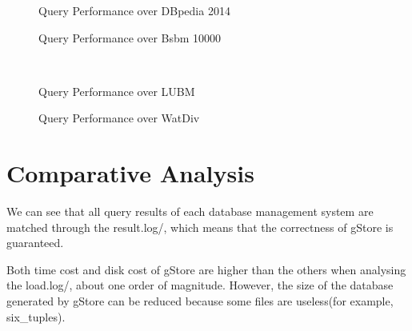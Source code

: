 \documentclass[titlepage, a4paper, 12pt] {article}
\begin{document}
\begin{figure}[b]%
	\resizebox{0.48\columnwidth}{!}{
		
	}
	\caption{Query Performance over DBpedia 2014}%
	\label{fig:dbpedia2014Performance}
\end{figure}

\begin{figure}%
	\resizebox{0.8\columnwidth}{!}{
		
	}
	\caption{Query Performance over Bsbm 10000}%
	\label{fig:BsbmPerformance}
\end{figure}


\begin{figure}[t]%
	\subfigure[LUBM 500]{%
		\resizebox{0.98\columnwidth}{!}{
			
		}
		\label{fig:LUBM500Performance}%
	}
	\\
	\subfigure[LUBM 5000]{%
		\resizebox{0.98\columnwidth}{!}{
			
		}
		\label{fig:LUBM5000Performance}%
	}%
	\caption{Query Performance over LUBM}%
	\label{fig:LUBMPerformance}
\end{figure}

\begin{figure}[t]%
	\subfigure[WatDiv 10M]{%
		\resizebox{0.8\columnwidth}{!}{
			
		}
		\label{fig:WatDiv10MPerformance}%
	}
	\subfigure[WatDiv 100M]{%
		\resizebox{0.8\columnwidth}{!}{
			
		}
		\label{fig:WatDiv100MPerformance}%
	}
	\subfigure[WatDiv 300M]{%
		\resizebox{0.8\columnwidth}{!}{
			
		}
		\label{fig:WatDiv300MPerformance}%
	}%
	\caption{Query Performance over WatDiv}%
	\label{fig:WatDivPerformance}
\end{figure}

\clearpage

\section{Comparative Analysis}

We can see that all query results of each database management system are matched through the result.log/, 
which means that the correctness of gStore is guaranteed. 

Both time cost and disk cost of gStore are higher than the others when analysing the load.log/,  
about one order of magnitude.  However, the size of the database generated by gStore can be reduced
because some files are useless(for example, six\_tuples).
\end{document}
